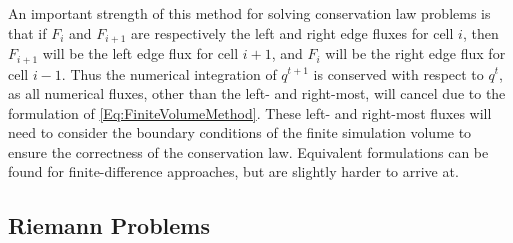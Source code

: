 An important strength of this method for solving conservation law problems is that if $F_i$ and $F_{i+1}$ are respectively the left and right edge fluxes for cell $i$, then $F_{i+1}$ will be the left edge flux for cell $i+1$, and $F_{i}$ will be the right edge flux for cell $i-1$.
Thus the numerical integration of $q^{t+1}$ is conserved with respect to $q^t$, as all numerical fluxes, other than the left- and right-most, will cancel due to the formulation of \eqref{Eq:FiniteVolumeMethod}.
These left- and right-most fluxes will need to consider the boundary conditions of the finite simulation volume to ensure the correctness of the conservation law.
Equivalent formulations can be found for finite-difference approaches, but are slightly harder to arrive at.


\subsection{Riemann Problems}








